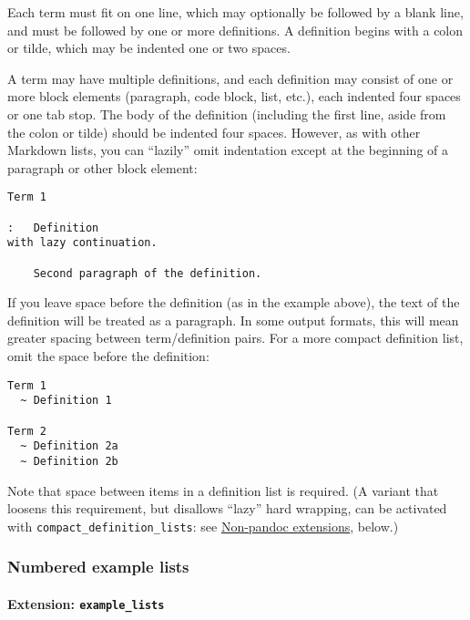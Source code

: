 \documentclass[]{article}
\begin{document}
Each term must fit on one line, which may optionally be followed by a
blank line, and must be followed by one or more definitions. A
definition begins with a colon or tilde, which may be indented one or
two spaces.

A term may have multiple definitions, and each definition may consist of
one or more block elements (paragraph, code block, list, etc.), each
indented four spaces or one tab stop. The body of the definition
(including the first line, aside from the colon or tilde) should be
indented four spaces. However, as with other Markdown lists, you can
``lazily'' omit indentation except at the beginning of a paragraph or
other block element:

\begin{verbatim}
Term 1

:   Definition
with lazy continuation.

    Second paragraph of the definition.
\end{verbatim}

If you leave space before the definition (as in the example above), the
text of the definition will be treated as a paragraph. In some output
formats, this will mean greater spacing between term/definition pairs.
For a more compact definition list, omit the space before the
definition:

\begin{verbatim}
Term 1
  ~ Definition 1

Term 2
  ~ Definition 2a
  ~ Definition 2b
\end{verbatim}

Note that space between items in a definition list is required. (A
variant that loosens this requirement, but disallows ``lazy'' hard
wrapping, can be activated with \texttt{compact\_definition\_lists}: see
\protect\hyperlink{non-pandoc-extensions}{Non-pandoc extensions},
below.)

\hypertarget{numbered-example-lists}{%
\subsubsection{Numbered example lists}\label{numbered-example-lists}}

\hypertarget{extension-example_lists}{%
\paragraph{\texorpdfstring{Extension:
\texttt{example\_lists}}{Extension: example\_lists}}\label{extension-example_lists}}
\end{document}
